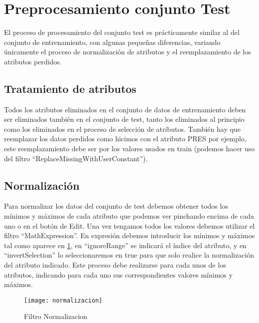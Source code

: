 \section{Preprocesamiento conjunto Test}

El proceso de procesamiento del conjunto test es prácticamente similar al del conjunto de entrenamiento, con algunas pequeñas diferencias, variando únicamente el proceso de normalización de atributos y el reemplazamiento de los atributos perdidos.

\subsection{Tratamiento de atributos}
Todos los atributos eliminados en el conjunto de datos de entrenamiento deben ser eliminados también en el conjunto de test, tanto los eliminados al principio como los eliminados en el proceso de selección de atributos. También hay que reemplazar los datos perdidos como hicimos con el atributo PRES por ejemplo, este reemplazamiento debe ser por los valores usados en train (podemos hacer uso del filtro ``ReplaceMissingWithUserConstant'').

\subsection{Normalización}
Para normalizar los datos del conjunto de test debemos obtener todos los mínimos y máximos de cada atributo que podemos ver pinchando encima de cada uno o en el botón de Edit. Una vez tengamos todos los valores debemos utilizar el filtro ``MathExpression''.
En expresión debemos introducir los mínimos y máximos tal como aparece en \ref{fig:Normalizacion}, en ``ignoreRange'' se indicará el índice del atributo, y en ``invertSelection'' lo seleccionaremos en true para que solo realice la normalización del atributo indicado. Este proceso debe realizarse para cada unos de los atributos, indicando para cada uno sus correspondientes valores mínimos y máximos.

\begin{figure}[H]
	\centering
	\texttt{[image: normalizacion]}
    \caption{Filtro Normalizacion}
    \label{fig:Normalizacion}
\end{figure}





